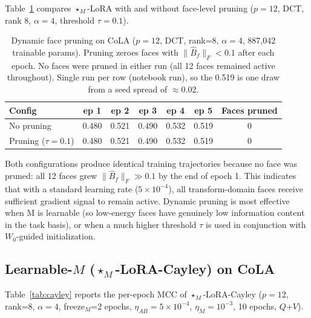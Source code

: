 \documentclass{article}
\theoremstyle{plain}
\begin{document}
Table~\ref{tab:pruning} compares $\star_M$-LoRA with and without face-level pruning
($p=12$, DCT, rank 8, $\alpha=4$, threshold $\tau=0.1$).

\begin{table}[h]
\centering
\caption{Dynamic face pruning on CoLA ($p=12$, DCT, rank=8, $\alpha=4$, 887,042 trainable params).
Pruning zeroes faces with $\|\hat{B}_f\|_F < 0.1$ after each epoch.
No faces were pruned in either run (all 12 faces remained active throughout).
Single run per row (notebook run), so the 0.519 is one draw from a seed spread of $\approx$0.02.}
\label{tab:pruning}
\begin{tabular}{lcccccc}
\toprule
Config & ep 1 & ep 2 & ep 3 & ep 4 & ep 5 & Faces pruned \\
\midrule
No pruning     & 0.480 & 0.521 & 0.490 & 0.532 & 0.519 & 0 \\
Pruning ($\tau{=}0.1$) & 0.480 & 0.521 & 0.490 & 0.532 & 0.519 & 0 \\
\bottomrule
\end{tabular}
\end{table}

\noindent
Both configurations produce identical training trajectories because no face was
pruned: all 12 faces grew $\|\hat{B}_f\|_F \gg 0.1$ by the end of epoch 1.
This indicates that with a standard learning rate ($5 \times 10^{-4}$), all
transform-domain faces receive sufficient gradient signal to remain active.
Dynamic pruning is most effective when M is learnable (so low-energy faces have
genuinely low information content in the task basis), or when a much higher
threshold $\tau$ is used in conjunction with $W_0$-guided initialization.

\subsection{Learnable-$M$ ($\star_M$-LoRA-Cayley) on CoLA}
\label{sec:cayley_exp}

Table~\ref{tab:cayley} reports the per-epoch MCC of $\star_M$-LoRA-Cayley
($p=12$, rank=8, $\alpha=4$, freeze$_M$=2 epochs, $\eta_{AB}=5\times10^{-4}$,
$\eta_M=10^{-3}$, 10 epochs, $Q$+$V$).
\end{document}
